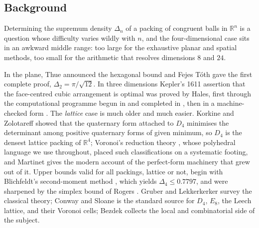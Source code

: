 \documentclass[11pt,reqno]{amsart}
\renewcommand{\_}{\origunderscore\allowbreak}
\numberwithin{equation}{section}
\theoremstyle{plain}
\theoremstyle{definition}
\theoremstyle{remark}
\begin{document}
\subsection{Background}\label{sec:history-new}

Determining the supremum density $\Delta_n$ of a packing of congruent
balls in $\mathbb{R}^n$ is a question whose difficulty varies wildly
with $n$, and the four-dimensional case sits in an awkward middle
range: too large for the exhaustive planar and spatial methods, too
small for the arithmetic that resolves dimensions $8$ and $24$.

In the plane, Thue \cite{Thu10} announced the hexagonal bound and Fejes
T\'oth \cite{FT42} gave the first complete proof, $\Delta_2 =
\pi/\sqrt{12}$. In three dimensions Kepler's 1611 assertion that the
face-centred cubic arrangement is optimal was proved by Hales, first
through the computational programme begun in \cite{Hal97} and completed
in \cite{Hal05}, then in a machine-checked form \cite{Hal17}. The
\emph{lattice} case is much older and much easier.
Korkine and Zolotareff \cite{KZ1872} showed that the quaternary form
attached to $D_4$ minimises the determinant among positive quaternary
forms of given minimum, so $D_4$ is the densest lattice packing of
$\mathbb{R}^4$; Voronoi's reduction theory \cite{Vor08}, whose
polyhedral language we use throughout, placed such classifications on a
systematic footing, and Martinet \cite{Mar03} gives the modern account
of the perfect-form machinery that grew out of it. Upper bounds valid
for all packings, lattice or not, begin with Blichfeldt's second-moment
method \cite{Bli29}, which yields $\Delta_4 \le 0.7797$, and were
sharpened by the simplex bound of Rogers \cite{Rog64}. Gruber and
Lekkerkerker \cite{Gru87} survey the classical theory; Conway and
Sloane \cite{CS1988} is the standard source for $D_4$, $E_8$, the Leech
lattice, and their Voronoi cells; Bezdek \cite{Bez10} collects the
local and combinatorial side of the subject.
\end{document}

